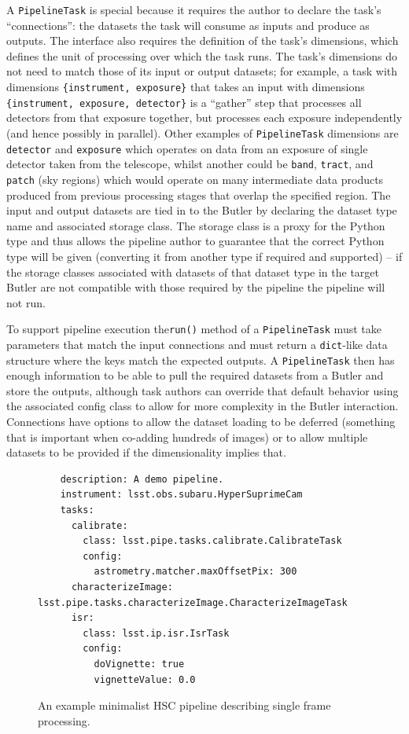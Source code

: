 \documentclass[]{spie}
\begin{document}
A \texttt{PipelineTask} is special because it requires the author to declare the task's ``connections'': the datasets the task will consume as inputs and produce as outputs.
The interface also requires the definition of the task's dimensions, which defines the unit of processing over which the task runs.
The task's dimensions do not need to match those of its input or output datasets; for example, a task with dimensions \texttt{\{instrument, exposure\}} that takes an input with dimensions \texttt{\{instrument, exposure, detector\}} is a ``gather'' step that processes all detectors from that exposure together, but processes each exposure independently (and hence possibly in parallel).
Other examples of \texttt{PipelineTask} dimensions are \texttt{detector} and \texttt{exposure} which operates on data from an exposure of single detector taken from the telescope, whilst another could be \texttt{band}, \texttt{tract}, and \texttt{patch} (sky regions) which would operate on many intermediate data products produced from previous processing stages that overlap the specified region.
The input and output datasets are tied in to the Butler by declaring the dataset type name and associated storage class.
The storage class is a proxy for the Python type and thus allows the pipeline author to guarantee that the correct Python type will be given (converting it from another type if required and supported) -- if the storage classes associated with datasets of that dataset type in the target Butler are not compatible with those required by the pipeline the pipeline will not run.

To support pipeline execution the\texttt{run()} method of a \texttt{PipelineTask} must take parameters that match the input connections and must return a \texttt{dict}-like data structure where the keys match the expected outputs.
A \texttt{PipelineTask} then has enough information to be able to pull the required datasets from a Butler and store the outputs, although task authors can override that default behavior using the associated config class to allow for more complexity in the Butler interaction.
Connections have options to allow the dataset loading to be deferred (something that is important when co-adding hundreds of images) or to allow multiple datasets to be provided if the dimensionality implies that.

\begin{figure}
  \lstset{language=YAML,basicstyle=\small\ttfamily}
  \begin{lstlisting}
    description: A demo pipeline.
    instrument: lsst.obs.subaru.HyperSuprimeCam
    tasks:
      calibrate:
        class: lsst.pipe.tasks.calibrate.CalibrateTask
        config:
          astrometry.matcher.maxOffsetPix: 300
      characterizeImage: lsst.pipe.tasks.characterizeImage.CharacterizeImageTask
      isr:
        class: lsst.ip.isr.IsrTask
        config:
          doVignette: true
          vignetteValue: 0.0
    \end{lstlisting}
  \caption{An example minimalist HSC pipeline describing single frame processing.}
  \label{fig:pipeline}
\end{figure}
\end{document}
